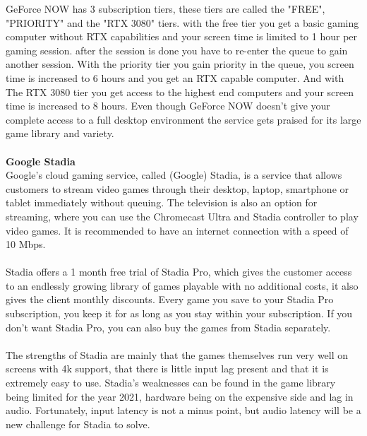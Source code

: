 GeForce NOW has 3 subscription tiers, these tiers are called the "FREE", "PRIORITY" and the "RTX 3080" tiers. with the free tier you get a basic gaming computer without RTX capabilities and your screen time is limited to 1 hour per gaming session. after the session is done you have to re-enter the queue to gain another session. With the priority tier you gain priority in the queue, you screen time is increased to 6 hours and you get an RTX capable computer. And with The RTX 3080 tier you get access to the highest end computers and your screen time is increased to 8 hours.
Even though GeForce NOW doesn't give your complete access to a full desktop environment the service gets praised for its large game library and variety.\\\\
\textbf{Google Stadia}\\
Google's cloud gaming service, called (Google) Stadia, is a service that allows customers to stream video games through their desktop, laptop, smartphone or tablet immediately without queuing. The television is also an option for streaming, where you can use the Chromecast Ultra and Stadia controller to play video games. It is recommended to have an internet connection with a speed of 10 Mbps.\\\\
Stadia offers a 1 month free trial of Stadia Pro, which gives the customer access to an endlessly growing library of games playable with no additional costs, it also gives the client monthly discounts. Every game you save to your Stadia Pro subscription, you keep it for as long as you stay within your subscription. If you don't want Stadia Pro, you can also buy the games from Stadia separately.\\\\
The strengths of Stadia are mainly that the games themselves run very well on screens with 4k support, that there is little input lag present and that it is extremely easy to use. Stadia's weaknesses can be found in the game library being limited for the year 2021, hardware being on the expensive side and lag in audio. Fortunately, input latency is not a minus point, but audio latency will be a new challenge for Stadia to solve.\\\\
